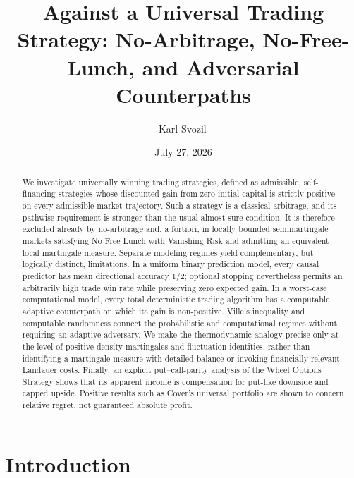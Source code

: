 \documentclass[aps,pra,reprint,superscriptaddress,amsmath,amssymb]{revtex4-2}
\theoremstyle{plain}
\theoremstyle{definition}
\theoremstyle{remark}
\begin{document}
\title{Against a Universal Trading Strategy: No-Arbitrage, No-Free-Lunch, and Adversarial Counterpaths}

\author{Karl Svozil\,}

\date{July 27, 2026}

\begin{abstract}
We investigate universally winning trading strategies, defined as admissible,
self-financing strategies whose discounted gain from zero initial capital is
strictly positive on every admissible market trajectory. Such a strategy is a
classical arbitrage, and its pathwise requirement is stronger than the usual
almost-sure condition. It is therefore excluded already by no-arbitrage and,
a fortiori, in locally bounded semimartingale markets satisfying No Free Lunch
with Vanishing Risk and admitting an equivalent local martingale measure.
Separate modeling regimes yield complementary, but logically distinct,
limitations. In a uniform binary prediction model, every causal predictor has
mean directional accuracy \(1/2\); optional stopping nevertheless permits an
arbitrarily high trade win rate while preserving zero expected gain. In a
worst-case computational model, every total deterministic trading algorithm
has a computable adaptive counterpath on which its gain is non-positive.
Ville's inequality and computable randomness connect the probabilistic and
computational regimes without requiring an adaptive adversary. We make the
thermodynamic analogy precise only at the level of positive density
martingales and fluctuation identities, rather than identifying a martingale
measure with detailed balance or invoking financially relevant Landauer
costs. Finally, an explicit put--call-parity analysis of the Wheel Options
Strategy shows that its apparent income is compensation for put-like downside
and capped upside. Positive results such as Cover's universal portfolio are
shown to concern relative regret, not guaranteed absolute profit.
\end{abstract}

\maketitle

\section{Introduction}
\label{sec:intro}
\end{document}
